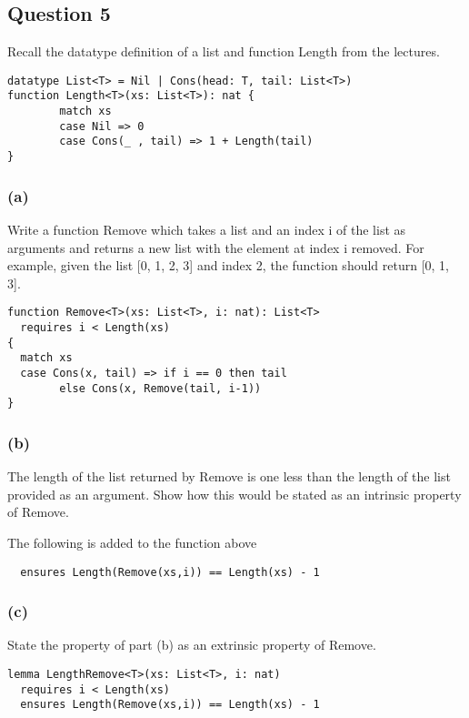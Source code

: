 \subsection{Question 5}

Recall the datatype definition of a list and function Length from the lectures.
\begin{verbatim}
datatype List<T> = Nil | Cons(head: T, tail: List<T>)
function Length<T>(xs: List<T>): nat {
        match xs
        case Nil => 0
        case Cons(_ , tail) => 1 + Length(tail)
}    
\end{verbatim}

\subsubsection{(a)}
Write a function Remove which takes a list and an index i of the list as arguments and
returns a new list with the element at index i removed. For example, given the list [0, 1, 2, 3] and
index 2, the function should return [0, 1, 3].

\begin{verbatim}
function Remove<T>(xs: List<T>, i: nat): List<T>
  requires i < Length(xs)
{
  match xs
  case Cons(x, tail) => if i == 0 then tail
        else Cons(x, Remove(tail, i-1))
}
\end{verbatim}

\subsubsection{(b)}
The length of the list returned by Remove is one less than the length of the list provided as
an argument. Show how this would be stated as an intrinsic property of Remove.

The following is added to the function above
\begin{verbatim}
  ensures Length(Remove(xs,i)) == Length(xs) - 1
\end{verbatim}

\subsubsection{(c)}
State the property of part (b) as an extrinsic property of Remove.
\begin{verbatim}
lemma LengthRemove<T>(xs: List<T>, i: nat)
  requires i < Length(xs)
  ensures Length(Remove(xs,i)) == Length(xs) - 1
\end{verbatim}